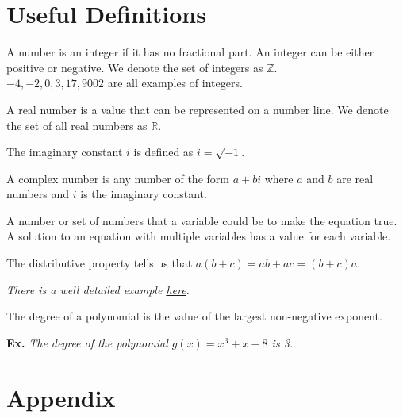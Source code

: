 \chapter*{Useful Definitions}


\begin{defn2}[Integer]\label{Integer}
	A number is an integer if it has no fractional part. An integer can be either positive or negative. We denote the set of integers as $\mathbb{Z}$. \\$-4, -2, 0, 3,17,  9002$ are all examples of integers. 
\end{defn2}

\begin{defn2}\label{Real Number}
A real number is a value that can be represented on a number line. We denote the set of all real numbers as $\mathbb{R}$.
\end{defn2}


\begin{defn2}\label{Imaginary Constant}
	The imaginary constant $i$ is defined as $i= \sqrt{-1}$.
\end{defn2}

\begin{defn2}\label{Complex Number}
	A complex number is any number of the form $a+bi$ where $a$ and $b$ are real numbers and $i$ is the imaginary constant. 
\end{defn2}

\begin{defn2}\label{Solution Set}
	A number or set of numbers that a variable could be to make the equation true.  A solution to an equation with multiple variables has a value for each variable. 
\end{defn2}


\begin{defn2}\label{Distributive Property}
	The distributive property tells us that $a(b+c)=ab+ac=(b+c)a$. 
	
	\noindent
	\emph{There is a well detailed example \hyperref[Distributive Example]{here}.}
\end{defn2}





\begin{defn2}[Degree]\label{Degree}
The degree of a polynomial is the value of the largest non-negative exponent. 

\noindent
\textbf{Ex.} \emph{The degree of the polynomial $g(x)=x^3 +x-8$ is 3.}
\end{defn2}


\chapter*{Appendix}

